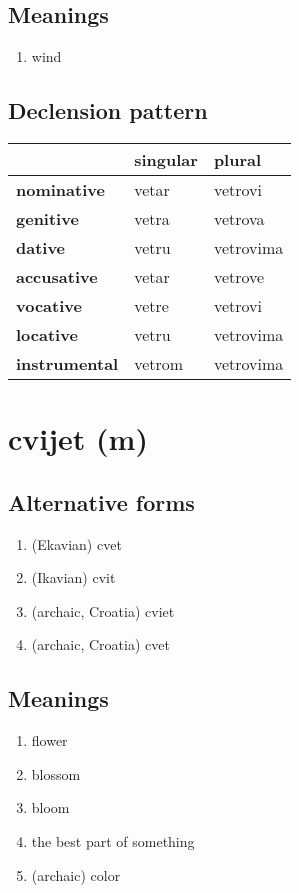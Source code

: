 \subsection*{Meanings}
\begin{enumerate}
\item wind
\end{enumerate}
\subsection*{Declension pattern}
\begin{tabularx}{\linewidth}{Xll}
\toprule
{} & singular &     plural \\
\midrule
\textbf{nominative  } &    vetar &    vetrovi \\
\textbf{genitive    } &    vetra &    vetrova \\
\textbf{dative      } &    vetru &  vetrovima \\
\textbf{accusative  } &    vetar &    vetrove \\
\textbf{vocative    } &    vetre &    vetrovi \\
\textbf{locative    } &    vetru &  vetrovima \\
\textbf{instrumental} &   vetrom &  vetrovima \\
\bottomrule
\end{tabularx}

\filbreak
\section{cvijet (m)}
\subsection*{Alternative forms}
\begin{enumerate}
\item (Ekavian) cvet
\item (Ikavian) cvit
\item (archaic, Croatia) cviet
\item (archaic, Croatia) cvet
\end{enumerate}
\subsection*{Meanings}
\begin{enumerate}
\item flower
\item blossom
\item bloom
\item the best part of something
\item (archaic) color
\end{enumerate}

